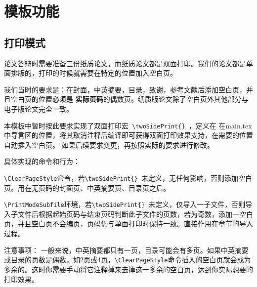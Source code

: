 \documentclass[../../main.tex]{subfiles}
\begin{document}
\section{模板功能}
\subsection{打印模式}
论文答辩时需要准备三份纸质论文，而纸质论文都是双面打印。我们的论文都是单面排版的，打印的时候就需要在特定的位置加入空白页。

我们当时的要求是：在封面，中英摘要，目录，致谢，参考文献后添加空白页，并且空白页的位置必须是
\textbf{实际页码}的偶数页。纸质版论文除了空白页外其他部分与电子版论文完全一致。


本模板中暂时按此要求实现了双面打印宏\verb| \twoSidePrint{} |，定义在
在main.tex中导言区的位置，将其取消注释后编译即可获得双面打印效果支持，在需要的位置自动插入空白页。
如果后续要求变更，再按照实际的要求进行修改。

具体实现的命令和行为：

\verb|\ClearPageStyle|命令，若\verb|\twoSidePrint{} |未定义，无任何影响，否则添加空白页。用在无页码的封面页、中英摘要页、目录页之后。

\verb|\PrintModeSubfile|环境，若\verb|\twoSidePrint{} |未定义，仅导入一子文件，否则导入子文件后根据起始页码与结束页码判断此子文件的页数，若为奇数，添加一空白页，并且空白页不会编页，页码仍与单面打印时保持一致。直接作用在章节的导入过程。


注意事项：
一般来说，中英摘要都只有一页，目录可能会有多页。如果中英摘要或目录的页数是偶数，如2页或4页，\verb|\ClearPageStyle|命令插入的空白页就会成为多余的。这时你需要手动将它注释掉来去掉这一多余的空白页，达到你实际想要的打印效果。
\end{document}
